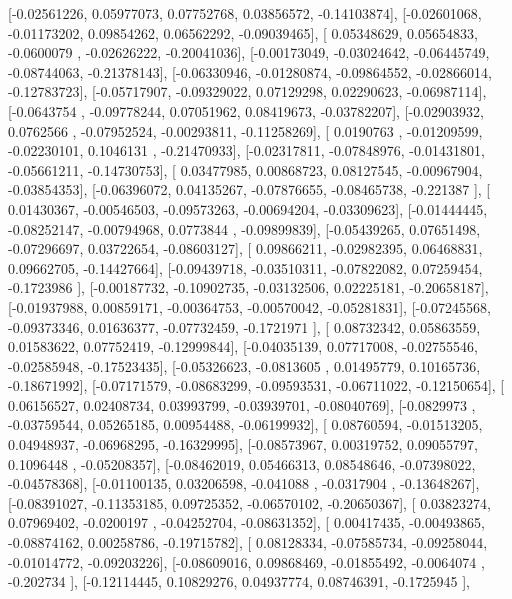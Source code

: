 \documentclass{article}
\begin{document}
       [-0.02561226,  0.05977073,  0.07752768,  0.03856572, -0.14103874],
       [-0.02601068, -0.01173202,  0.09854262,  0.06562292, -0.09039465],
       [ 0.05348629,  0.05654833, -0.0600079 , -0.02626222, -0.20041036],
       [-0.00173049, -0.03024642, -0.06445749, -0.08744063, -0.21378143],
       [-0.06330946, -0.01280874, -0.09864552, -0.02866014, -0.12783723],
       [-0.05717907, -0.09329022,  0.07129298,  0.02290623, -0.06987114],
       [-0.0643754 , -0.09778244,  0.07051962,  0.08419673, -0.03782207],
       [-0.02903932,  0.0762566 , -0.07952524, -0.00293811, -0.11258269],
       [ 0.0190763 , -0.01209599, -0.02230101,  0.1046131 , -0.21470933],
       [-0.02317811, -0.07848976, -0.01431801, -0.05661211, -0.14730753],
       [ 0.03477985,  0.00868723,  0.08127545, -0.00967904, -0.03854353],
       [-0.06396072,  0.04135267, -0.07876655, -0.08465738, -0.221387  ],
       [ 0.01430367, -0.00546503, -0.09573263, -0.00694204, -0.03309623],
       [-0.01444445, -0.08252147, -0.00794968,  0.0773844 , -0.09899839],
       [-0.05439265,  0.07651498, -0.07296697,  0.03722654, -0.08603127],
       [ 0.09866211, -0.02982395,  0.06468831,  0.09662705, -0.14427664],
       [-0.09439718, -0.03510311, -0.07822082,  0.07259454, -0.1723986 ],
       [-0.00187732, -0.10902735, -0.03132506,  0.02225181, -0.20658187],
       [-0.01937988,  0.00859171, -0.00364753, -0.00570042, -0.05281831],
       [-0.07245568, -0.09373346,  0.01636377, -0.07732459, -0.1721971 ],
       [ 0.08732342,  0.05863559,  0.01583622,  0.07752419, -0.12999844],
       [-0.04035139,  0.07717008, -0.02755546, -0.02585948, -0.17523435],
       [-0.05326623, -0.0813605 ,  0.01495779,  0.10165736, -0.18671992],
       [-0.07171579, -0.08683299, -0.09593531, -0.06711022, -0.12150654],
       [ 0.06156527,  0.02408734,  0.03993799, -0.03939701, -0.08040769],
       [-0.0829973 , -0.03759544,  0.05265185,  0.00954488, -0.06199932],
       [ 0.08760594, -0.01513205,  0.04948937, -0.06968295, -0.16329995],
       [-0.08573967,  0.00319752,  0.09055797,  0.1096448 , -0.05208357],
       [-0.08462019,  0.05466313,  0.08548646, -0.07398022, -0.04578368],
       [-0.01100135,  0.03206598, -0.041088  , -0.0317904 , -0.13648267],
       [-0.08391027, -0.11353185,  0.09725352, -0.06570102, -0.20650367],
       [ 0.03823274,  0.07969402, -0.0200197 , -0.04252704, -0.08631352],
       [ 0.00417435, -0.00493865, -0.08874162,  0.00258786, -0.19715782],
       [ 0.08128334, -0.07585734, -0.09258044, -0.01014772, -0.09203226],
       [-0.08609016,  0.09868469, -0.01855492, -0.0064074 , -0.202734  ],
       [-0.12114445,  0.10829276,  0.04937774,  0.08746391, -0.1725945 ],
\end{document}
